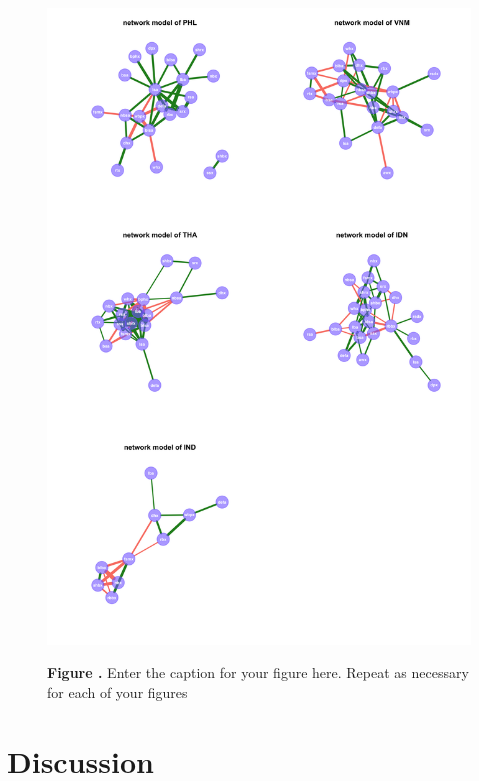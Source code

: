 \documentclass[a4paper]{article}
\begin{document}
\begin{figure}[h!]
\begin{center}
\includegraphics[width=15cm]{Netcountry}
\end{center}
 \textbf{\label{Netcountry} Figure .}{ Enter the caption for your figure here.  Repeat as  necessary for each of your figures}
\end{figure}

\section*{Discussion}


\end{document}
